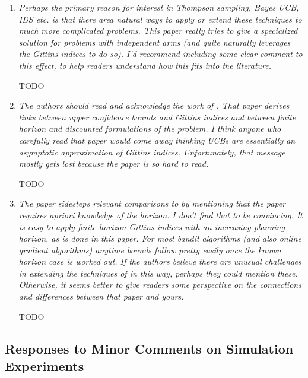 \documentclass[11pt]{article}
\newcommand{\1}{\ensuremath{\mathbf{1}}} %
\theoremstyle{thm-sf}
\begin{document}
	\begin{enumerate}
		\item {\it Perhaps the primary reason for interest in Thompson sampling, Bayes UCB, IDS etc. is that there area natural ways to apply or extend these techniques to much more complicated problems. This paper really tries to give a specialized solution for problems with independent arms (and quite naturally leverages the Gittins indices to do so). I'd recommend including some clear comment to this effect, to help readers understand how this fits into the literature.}
		
		TODO
		
		\item {\it The authors should read and acknowledge the work of \citep{chang1987optimal}. That paper derives links between upper confidence bounds and Gittins indices and between finite horizon and discounted formulations of the problem. I think anyone who carefully read that paper would come away thinking UCBs are essentially an asymptotic approximation of Gittins indices. Unfortunately, that message mostly gets lost because the paper is so hard to read.}
		
		TODO
		
		\item {\it The paper sidesteps relevant comparisons to \cite{lattimore2016bayesregret} by mentioning that the paper requires apriori knowledge of the horizon. I don't find that to be convincing. It is easy to apply finite horizon Gittins indices with an increasing planning horizon, as is done in this paper. For most bandit algorithms (and also online gradient algorithms) anytime bounds follow pretty easily once the known horizon case is worked out. If the authors believe there are unusual challenges in extending the techniques of \cite{lattimore2016bayesregret} in this way, perhaps they could mention these. Otherwise, it seems better to give readers some perspective on the connections and differences between that paper and yours.
		}
		
		TODO
		
	\end{enumerate}
	
	\subsection{Responses to Minor Comments on Simulation Experiments}
	
\end{document}
